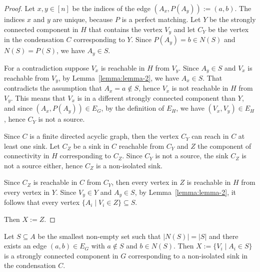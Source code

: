 \begin{proof}
    Let $x, y \in [n]$ be the indices of the edge $(A_x, P(A_y)) := (a, b)$.
    The indices $x$ and $y$ are unique, because $P$ is a perfect matching.
    Let $Y$ be the strongly connected component in $H$ that contains the vertex $V_y$
    and let $C_Y$ be the vertex in the condensation $C$ corresponding to $Y$.
    Since $P(A_y) = b \in N(S)$ and $N(S) = P(S)$, we have $A_y \in S$.

    For a contradiction suppose $V_x$ is reachable in $H$ from $V_y$.
    Since $A_y \in S$ and $V_x$ is reachable from $V_y$, by Lemma~\ref{lemma:lemma-2}, we have $A_x \in S$.
    That contradicts the assumption that $A_x = a \notin S$, hence $V_x$ is not reachable in $H$ from $V_y$.
    This means that $V_x$ is in a different strongly connected component than $Y$,
    and since $(A_x, P(A_y)) \in E_G$, by the definition of $E_H$, we have $(V_x, V_y) \in E_H$,
    hence $C_Y$ is not a source.

    Since $C$ is a finite directed acyclic graph, then the vertex $C_Y$ can reach in $C$ at least one sink.
    Let $C_Z$ be a sink in $C$ reachable from $C_Y$ and $Z$ the component of connectivity in $H$ corresponding to $C_Z$.
    Since $C_Y$ is not a source, the sink $C_Z$ is not a source either, hence $C_Z$ is a non-isolated sink.

    Since $C_Z$ is reachable in $C$ from $C_Y$, then every vertex in $Z$ is reachable in $H$ from every vertex in $Y$.
    Since $V_y \in Y$ and $A_y \in S$,
    by Lemma~\ref{lemma:lemma-2}, it follows that every vertex $\{A_i \mid V_i \in Z\} \subseteq S$.

    Then $X := Z$.
\end{proof}

\begin{thm}\label{thm:condensation}
    Let $S \subseteq A$ be the smallest non-empty set such that $\left|N(S)\right| = \left|S\right|$ and
    there exists an edge $(a, b) \in E_G$ with $a \notin S$ and $b \in N(S)$.
    Then $X := \{V_i \mid A_i \in S\}$ is a strongly connected component in $G$
    corresponding to a non-isolated sink in the condensation $C$.
\end{thm}

